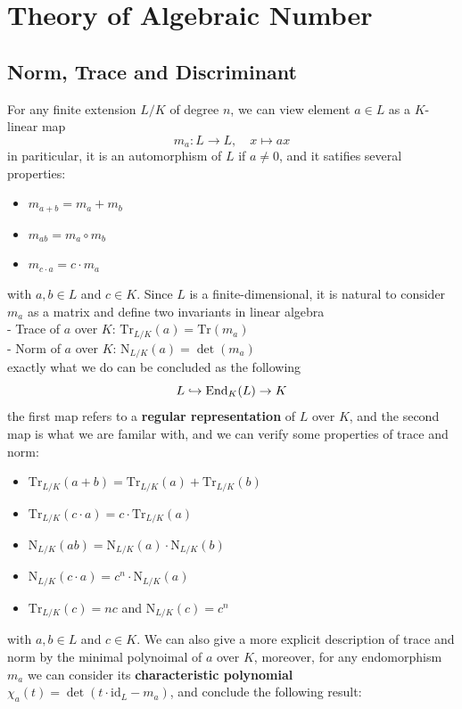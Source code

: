 \section{Theory of Algebraic Number}
\subsection{Norm, Trace and Discriminant}

For any finite extension \(L/K\) of degree \(n\), we can view element \(a \in L\) as a \(K\)-linear map
\[m_a: L \to L, \quad x \mapsto ax\]
in pariticular, it is an automorphism of \(L\) if \(a \neq 0\), and it satifies several properties:
\begin{itemize}
  \item \(m_{a+b} = m_a + m_b\)
  \item \(m_{ab} = m_a \circ m_b\)
  \item \(m_{c\cdot a} = c\cdot m_a\)
\end{itemize}
with \(a,b \in L\) and \(c \in K\). Since \(L\) is a finite-dimensional, it is natural to consider \(m_a\) as a matrix and define two invariants in linear algebra\\

- Trace of \(a\) over \(K\): \(\mathrm{Tr}_{L/K}(a) = \mathrm{Tr}(m_a)\)\\

- Norm of \(a\) over \(K\): \(\mathrm{N}_{L/K}(a) = \det(m_a)\)\\

exactly what we do can be concluded as the following
\[L \hookrightarrow \operatorname{End}_K(L) \to K\]
the first map refers to a \textbf{regular representation} of \(L\) over \(K\), and the second map is what we are familar with, and we can verify some properties of trace and norm:
\begin{itemize}
  \item \(\mathrm{Tr}_{L/K}(a+b) = \mathrm{Tr}_{L/K}(a) + \mathrm{Tr}_{L/K}(b)\)
  \item \(\mathrm{Tr}_{L/K}(c\cdot a) = c\cdot \mathrm{Tr}_{L/K}(a)\)
  \item \(\mathrm{N}_{L/K}(ab) = \mathrm{N}_{L/K}(a)\cdot\mathrm{N}_{L/K}(b)\)
  \item \(\mathrm{N}_{L/K}(c\cdot a) = c^n \cdot \mathrm{N}_{L/K}(a)\)
  \item \(\mathrm{Tr}_{L/K}(c) = nc\) and \(\mathrm{N}_{L/K}(c) = c^n\)
\end{itemize}
with \(a,b \in L\) and \(c \in K\). We can also give a more explicit description of trace and norm by the minimal polynoimal of \(a\) over \(K\), moreover, for any endomorphism \(m_a\) we can consider its \textbf{characteristic polynomial} \(\chi_a(t) = \det(t\cdot \mathrm{id}_L - m_a)\), and conclude the following result:

